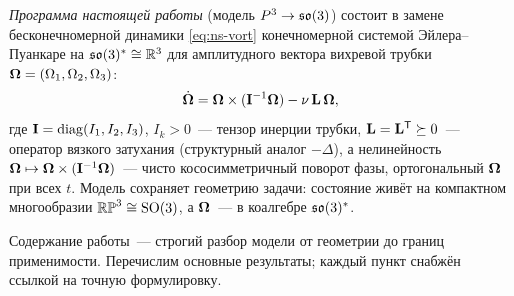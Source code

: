 \emph{Программа настоящей работы} (модель $P^3 \to \mathfrak{so}(3)$) состоит в замене
бесконечномерной динамики \eqref{eq:ns-vort} конечномерной системой
Эйлера--Пуанкаре на $\mathfrak{so}(3)^{*} \cong \mathbb{R}^3$ для амплитудного вектора
вихревой трубки $\boldsymbol{\Omega} = (\Omega_1,\Omega_2,\Omega_3)$:
\begin{equation}\label{eq:epd-intro}
  \dot{\boldsymbol{\Omega}} = \boldsymbol{\Omega} \times (\mathbf{I}^{-1}\boldsymbol{\Omega}) - \nu\,\mathbf{L}\,\boldsymbol{\Omega},
\end{equation}
где $\mathbf{I} = \operatorname{diag}(I_1,I_2,I_3)$, $I_k > 0$~--- тензор инерции трубки,
$\mathbf{L} = \mathbf{L}^{\mathsf T} \succeq 0$~--- оператор вязкого затухания
(структурный аналог $-\Delta$), а нелинейность
$\boldsymbol{\Omega} \mapsto \boldsymbol{\Omega} \times (\mathbf{I}^{-1}\boldsymbol{\Omega})$~--- чисто кососимметричный
поворот фазы, ортогональный $\boldsymbol{\Omega}$ при всех $t$. Модель сохраняет
геометрию задачи: состояние живёт на компактном многообразии
$\mathbb{RP}^3 \cong \mathrm{SO}(3)$, а $\boldsymbol{\Omega}$~--- в коалгебре $\mathfrak{so}(3)^{*}$.

Содержание работы~--- строгий разбор модели от геометрии до границ
применимости. Перечислим основные результаты; каждый пункт снабжён
ссылкой на точную формулировку.


